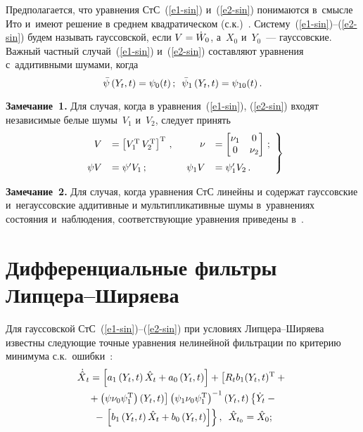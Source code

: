 \begin{multicols}{2}
Предполагается, что уравнения СтС~(\ref{e1-sin}) и~(\ref{e2-sin}) понимаются в~смысле Ито и~имеют решение в среднем квадратическом (с.к.)~\cite{1-sin}.
Систему~(\ref{e1-sin})--(\ref{e2-sin}) будем называть гауссовской, если  $V\hm=\dot W_0$, а~$X_0$ и~$Y_0$~--- гауссовские.
Важный частный случай~(\ref{e1-sin}) и~(\ref{e2-sin}) составляют уравнения с~аддитивными шумами, когда
    \begin{equation*}
    \bar\psi\left(Y_t, t\right) = \psi_0 (t)\,;\enskip \bar\psi_1 \left(Y_t, t\right) = \psi_{10} (t)\,.
    \end{equation*}

\noindent
\textbf{Замечание~1.} Для случая, когда в уравнения~(\ref{e1-sin}), (\ref{e2-sin}) входят независимые белые шумы~$V_1$ и~$V_2$, следует принять
    \begin{equation}
    \left.
    \begin{array}{rlrl}
    V&= \left[ V_1^{\mathrm{T}}\, V_2^{\mathrm{T}}\right]^{\mathrm{T}}\,,\enskip & \nu&=\begin{bmatrix}
    \nu_1&0\\
    0&\nu_2\end{bmatrix}\,;\\[12pt]
    \psi V &=\psi' V_1\,;\enskip  &\psi_1 V &= \psi_1' V_2\,.
    \end{array}
    \right\}
    \label{e5-sin}
    \end{equation}

\noindent
\textbf{Замечание~2.}
 Для случая, когда уравнения СтС линейны и содержат гауссовские и~негауссовские аддитивные и мультипликативные шумы в~уравнениях состояния  и~наблюдения, соответствующие уравнения приведены в~\cite{2-sin, 3-sin}.



\section{Дифференциальные фильтры Липцера--Ширяева}

Для гауссовской СтС~(\ref{e1-sin})--(\ref{e2-sin}) при условиях Лип\-це\-ра--Ши\-ря\-ева известны следующие точные уравнения нелинейной фильтрации по критерию минимума с.к.\ ошибки~\cite{1-sin, 7-sin}:
 \begin{multline}
 {\dot{\hat X}}_t= \left[a_1 \left(Y_t,t\right) \hat X_t + a_0 \left(Y_t,t\right)\right] + \left[R_tb_1 (Y_t,t)^{\mathrm{T}} +{}\right.\\
\left. {}+\left(\psi\nu_0\psi_1^{\mathrm{T}}\right)
    (Y_t,t)\right] \left(\psi_1\nu_0\psi_1^{\mathrm{T}}\right)^{-1} \left(Y_t,t\right)
\left\{ \dot Y_t -{}\right.\\
{}-\left.\left[ b_1\left(Y_t,t\right) \hat X_t +b_0\left(Y_t,t\right)\right] \right\},\enskip
    \hat X_{t_0} = \hat X_0;\label{e6-sin}
    \end{multline}


\end{multicols}
